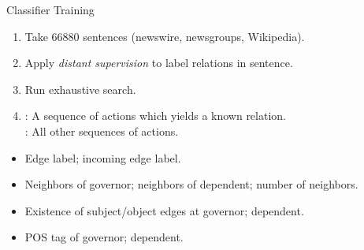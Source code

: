 \def\title{Classifier Training}
\begin{frame}{\title}
\begin{enumerate}
  \item Take \num{66880} sentences (newswire, newsgroups, Wikipedia).
  \pause
  \item Apply \textit{distant supervision} to label relations in sentence.
  \pause
  \item Run exhaustive search.
  \pause
  \item {}: A sequence of actions which yields a known relation. \\
        : All other sequences of actions.
\end{enumerate}
\hspace{0.5em}
\pause

\begin{itemize}
  \item Edge label; incoming edge label.
  \item Neighbors of governor; neighbors of dependent; number of neighbors.
  \item Existence of subject/object edges at governor; dependent.
  \item POS tag of governor; dependent.
\end{itemize}
\end{frame}




